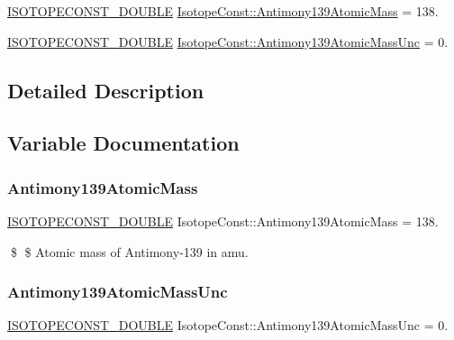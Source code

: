 \begin{DoxyCompactItemize}
\item 
\mbox{\hyperlink{group___isotope_const-_macros_ga8f45a7272ce02c0b4c65c44636ed719a}{I\+S\+O\+T\+O\+P\+E\+C\+O\+N\+S\+T\+\_\+\+D\+O\+U\+B\+LE}} \mbox{\hyperlink{group___isotope_const-_antimony-_sb139_ga8b9ec56a0bf8425033385079135a9564}{Isotope\+Const\+::\+Antimony139\+Atomic\+Mass}} = 138.
\item 
\mbox{\hyperlink{group___isotope_const-_macros_ga8f45a7272ce02c0b4c65c44636ed719a}{I\+S\+O\+T\+O\+P\+E\+C\+O\+N\+S\+T\+\_\+\+D\+O\+U\+B\+LE}} \mbox{\hyperlink{group___isotope_const-_antimony-_sb139_ga1a53fd441cf1fce2e550fa45838b9140}{Isotope\+Const\+::\+Antimony139\+Atomic\+Mass\+Unc}} = 0.
\end{DoxyCompactItemize}


\subsection{Detailed Description}


\subsection{Variable Documentation}
\mbox{\label{group___isotope_const-_antimony-_sb139_ga8b9ec56a0bf8425033385079135a9564}} 
\subsubsection{\texorpdfstring{Antimony139\+Atomic\+Mass}{Antimony139AtomicMass}}
{\footnotesize\ttfamily \mbox{\hyperlink{group___isotope_const-_macros_ga8f45a7272ce02c0b4c65c44636ed719a}{I\+S\+O\+T\+O\+P\+E\+C\+O\+N\+S\+T\+\_\+\+D\+O\+U\+B\+LE}} Isotope\+Const\+::\+Antimony139\+Atomic\+Mass = 138.}

\$ \$ Atomic mass of Antimony-\/139 in amu. \mbox{\label{group___isotope_const-_antimony-_sb139_ga1a53fd441cf1fce2e550fa45838b9140}} 
\subsubsection{\texorpdfstring{Antimony139\+Atomic\+Mass\+Unc}{Antimony139AtomicMassUnc}}
{\footnotesize\ttfamily \mbox{\hyperlink{group___isotope_const-_macros_ga8f45a7272ce02c0b4c65c44636ed719a}{I\+S\+O\+T\+O\+P\+E\+C\+O\+N\+S\+T\+\_\+\+D\+O\+U\+B\+LE}} Isotope\+Const\+::\+Antimony139\+Atomic\+Mass\+Unc = 0.}

